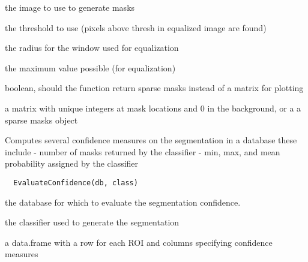 \documentclass[a4paper]{book}
\begin{document}
%
\begin{Arguments}
\begin{ldescription}
\item[\code{image}] the image to use to generate masks

\item[\code{thresh}] the threshold to use (pixels above thresh
in equalized image are found)

\item[\code{radius}] the radius for the window used for
equalization

\item[\code{fullmax}] the maximum value possible (for
equalization)

\item[\code{sparse}] boolean, should the function return sparse
masks instead of a matrix for plotting
\end{ldescription}
\end{Arguments}
%
\begin{Value}
a matrix with unique integers at mask locations and 0 in
the background, or a a sparse masks object
\end{Value}
%
\begin{Description}\relax
Computes several confidence measures on the segmentation
in a database these include - number of masks returned by
the classifier - min, max, and mean probability assigned
by the classifier
\end{Description}
%
\begin{Usage}
\begin{verbatim}
  EvaluateConfidence(db, class)
\end{verbatim}
\end{Usage}
%
\begin{Arguments}
\begin{ldescription}
\item[\code{db}] the database for which to evaluate the
segmentation confidence.

\item[\code{class}] the classifier used to generate the
segmentation
\end{ldescription}
\end{Arguments}
%
\begin{Value}
a data.frame with a row for each ROI and columns
specifying confidence measures
\end{Value}
\end{document}
